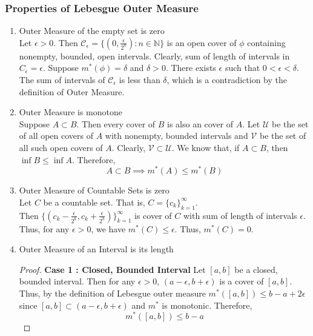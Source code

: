 \subsubsection{Properties of Lebesgue Outer Measure}
\begin{enumerate}
	\item Outer Measure of the empty set is zero\\
	Let $\epsilon > 0$.
	Then $\mathcal{C}_\epsilon = \{ (0,\frac{\epsilon}{2^n}) : n \in \mathbb{N} \}$ is an open cover of $\phi$ containing nonempty, bounded, open intervals.
	Clearly, sum of length of intervals in $C_\epsilon = \epsilon$.
	Suppose $m^\ast(\phi) = \delta$ and $\delta > 0$.
	There exists $\epsilon$ such that $0 < \epsilon < \delta$.
	The sum of intervals of $\mathcal{C}_\epsilon$ is less than $\delta$, which is a contradiction by the definition of Outer Measure.
	\item Outer Measure is monotone\\
	Suppose $A \subset B$.
	Then every cover of $B$ is also an  cover of $A$.
	Let $\mathcal{U}$ be the set of all open covers of $A$ with nonempty, bounded intervals and $\mathcal{V}$ be the set of all such open covers of $A$.
	Clearly, $\mathcal{V} \subset \mathcal{U}$.
	We know that, if $A \subset B$, then $\inf{B} \le \inf{A}$.
	Therefore,
	\begin{equation}
		A \subset B \implies m^\ast(A) \le m^\ast(B)
	\end{equation}
	\item Outer Measure of Countable Sets is zero\\
	Let $C$ be a countable set.
	That is, $C = \{ c_k \}_{k=1}^\infty$.\\
	Then $\{ (c_k-\frac{\epsilon}{2^k}, c_k + \frac{\epsilon}{2^k}) \}_{k=1}^\infty$ is cover of $C$ with sum of length of intervals $\epsilon$.
	Thus, for any $\epsilon > 0$, we have $m^\ast(C) \le \epsilon$.
	Thus, $m^\ast(C) = 0$.
	\item Outer Measure of an Interval is its length
	\begin{proof}
		\textbf{Case 1 : Closed, Bounded Interval}
		Let $[a,b]$ be a closed, bounded interval.
		Then for any $\epsilon > 0$, $(a-\epsilon,b+\epsilon)$ is a cover of $[a,b]$.
		Thus, by the definition of Lebesgue outer measure $m^\ast([a,b]) \le b-a+2\epsilon$ since $[a,b] \subset (a-\epsilon,b+\epsilon)$ and $m^\ast$ is monotonic.
		Therefore,
	\begin{equation}
		m^\ast([a,b]) \le b-a
	\end{equation}


\end{proof}
\end{enumerate}

